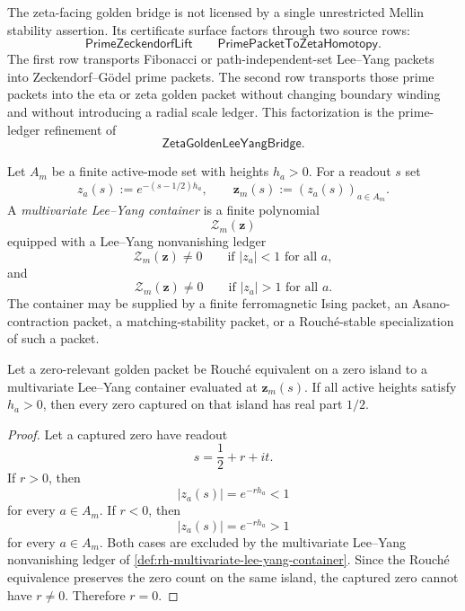 \begin{principle}
\label{prin:rh-bridge-factorization-prime-registers}
The zeta-facing golden bridge is not licensed by a single unrestricted
Mellin stability assertion.  Its certificate surface factors through
two source rows:
$$
\mathsf{PrimeZeckendorfLift}
\qquad
\mathsf{PrimePacketToZetaHomotopy}.
$$
The first row transports Fibonacci or path-independent-set
Lee--Yang packets into Zeckendorf--G\"odel prime packets.  The second
row transports those prime packets into the eta or zeta golden packet
without changing boundary winding and without introducing a radial
scale ledger.  This factorization is the prime-ledger refinement of
$$
\mathsf{ZetaGoldenLeeYangBridge}.
$$
\end{principle}

\begin{definition}
\label{def:rh-multivariate-lee-yang-container}
Let $A_m$ be a finite active-mode set with heights $h_a>0$.  For a
readout $s$ set
$$
z_a(s):=e^{-(s-1/2)h_a},
\qquad
\mathbf z_m(s):=(z_a(s))_{a\in A_m}.
$$
A \emph{multivariate Lee--Yang container} is a finite polynomial
$$
\mathcal Z_m(\mathbf z)
$$
equipped with a Lee--Yang nonvanishing ledger
$$
\mathcal Z_m(\mathbf z)\neq0
\qquad
\text{if } |z_a|<1\text{ for all }a,
$$
and
$$
\mathcal Z_m(\mathbf z)\neq0
\qquad
\text{if } |z_a|>1\text{ for all }a.
$$
The container may be supplied by a finite ferromagnetic Ising packet, an
Asano-contraction packet, a matching-stability packet, or a
Rouch\'e-stable specialization of such a packet.
\end{definition}

\begin{theorem}
\label{thm:rh-multivariate-container-no-scale-readout}
Let a zero-relevant golden packet be Rouch\'e equivalent on a zero
island to a multivariate Lee--Yang container evaluated at
$\mathbf z_m(s)$.  If all active heights satisfy $h_a>0$, then every
zero captured on that island has real part $1/2$.
\end{theorem}

\begin{proof}
Let a captured zero have readout
$$
s=\frac12+r+it.
$$
If $r>0$, then
$$
|z_a(s)|=e^{-rh_a}<1
$$
for every $a\in A_m$.  If $r<0$, then
$$
|z_a(s)|=e^{-rh_a}>1
$$
for every $a\in A_m$.  Both cases are excluded by the multivariate
Lee--Yang nonvanishing ledger of
\autoref{def:rh-multivariate-lee-yang-container}.  Since the Rouch\'e
equivalence preserves the zero count on the same island, the captured
zero cannot have $r\ne0$.  Therefore $r=0$.
\end{proof}

